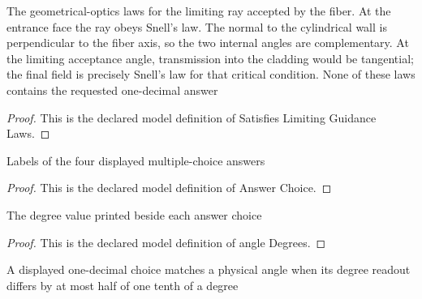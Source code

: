 \begin{definition}
  \label{def:physics:phyx-mini-0098:phyxminiproblems-problemphyxmini0098-satisfieslimitingguidancelaws}
  The geometrical-optics laws for the limiting ray accepted by the fiber. At the entrance face the ray obeys Snell's law. The normal to the cylindrical wall is perpendicular to the fiber axis, so the two internal angles are complementary. At the limiting acceptance angle, transmission into the cladding would be tangential; the final field is precisely Snell's law for that critical condition. None of these laws contains the requested one-decimal answer
\end{definition}
\begin{proof}
  This is the declared model definition of Satisfies Limiting Guidance Laws.
\end{proof}
\begin{definition}
  \label{def:physics:phyx-mini-0098:phyxminiproblems-problemphyxmini0098-answerchoice}
  Labels of the four displayed multiple-choice answers
\end{definition}
\begin{proof}
  This is the declared model definition of Answer Choice.
\end{proof}
\begin{definition}
  \label{def:physics:phyx-mini-0098:phyxminiproblems-problemphyxmini0098-answerchoice-angledegrees}
  The degree value printed beside each answer choice
\end{definition}
\begin{proof}
  This is the declared model definition of angle Degrees.
\end{proof}
\begin{definition}
  \label{def:physics:phyx-mini-0098:phyxminiproblems-problemphyxmini0098-matchesnearesttenthdegree}
  A displayed one-decimal choice matches a physical angle when its degree readout differs by at most half of one tenth of a degree
\end{definition}
